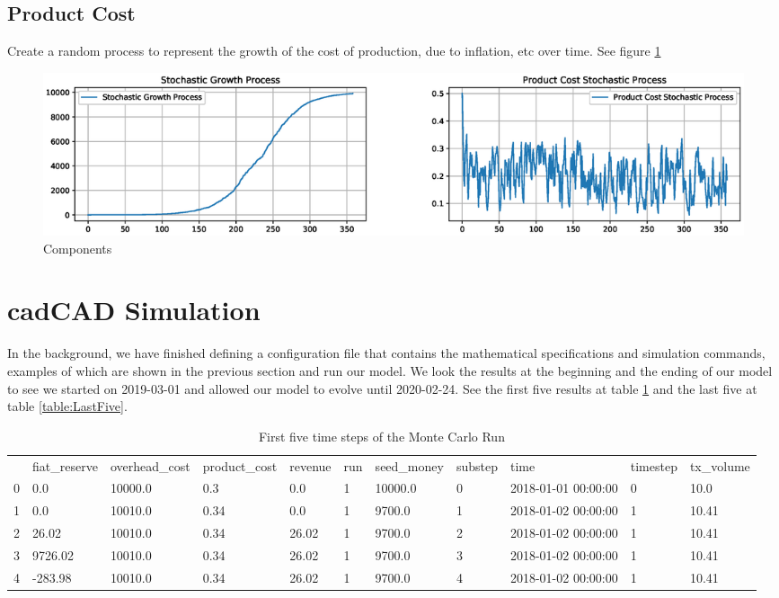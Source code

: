 \documentclass[12pt]{extarticle}
\begin{document}
\subsection{Product Cost}
Create a random process to represent the growth of the cost of production, due to inflation, etc over time. See figure \ref{fig:components}
\\
\begin{figure}[h]
    \centering
    \includegraphics[width=1\textwidth]{images/components.eps}
    \caption{Components}
    \label{fig:components}
\end{figure}

\section{cadCAD Simulation}
In the background, we have finished defining a configuration file that contains the mathematical specifications and simulation commands, examples of which are shown in the previous section and run our model.
We look the results at the beginning and the ending of our model to see we started on 2019-03-01 and allowed our model to evolve until 2020-02-24. See the first five results at table \ref{table:FirstFive} and the last five at table \ref{table:LastFive}. \\ 


\begin{table}[h]
	\centering
	\begin{adjustbox}{max width=\textwidth}
	\begin{tabular}{lllllllllll}
		\toprule
		& fiat\_reserve & overhead\_cost & product\_cost & revenue & run & seed\_money & substep & time                & timestep & tx\_volume \\
		0 & 0.0           & 10000.0        & 0.3           & 0.0     & 1   & 10000.0     & 0       & 2018-01-01 00:00:00 & 0        & 10.0       \\
		1 & 0.0           & 10010.0        & 0.34          & 0.0     & 1   & 9700.0      & 1       & 2018-01-02 00:00:00 & 1        & 10.41      \\
		2 & 26.02         & 10010.0        & 0.34          & 26.02   & 1   & 9700.0      & 2       & 2018-01-02 00:00:00 & 1        & 10.41      \\
		3 & 9726.02       & 10010.0        & 0.34          & 26.02   & 1   & 9700.0      & 3       & 2018-01-02 00:00:00 & 1        & 10.41      \\
		4 & -283.98       & 10010.0        & 0.34          & 26.02   & 1   & 9700.0      & 4       & 2018-01-02 00:00:00 & 1        & 10.41  \\ \bottomrule   
	\end{tabular}
\end{adjustbox}
\caption{First five time steps of the Monte Carlo Run}
\label{table:FirstFive}
\end{table}
\end{document}
